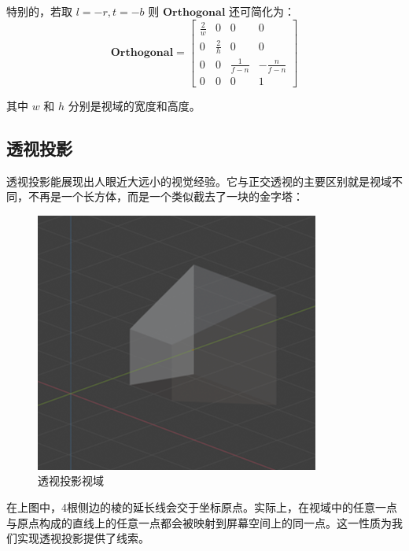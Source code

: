 \documentclass[12pt,oneside,a4paper]{ctexart}
\begin{document}
特别的，若取 $l=-r, t=-b$ 则 $\mathbf{Orthogonal}$ 还可简化为：
\begin{equation}
	\mathbf{Orthogonal}=
	\begin{bmatrix}
		\frac{2}{w} & 0           & 0             & 0              \\
		0           & \frac{2}{h} & 0             & 0              \\
		0           & 0           & \frac{1}{f-n} & -\frac{n}{f-n} \\
		0           & 0           & 0             & 1
	\end{bmatrix}
\end{equation}

其中 $w$ 和 $h$ 分别是视域的宽度和高度。
\subsection{透视投影}
透视投影能展现出人眼近大远小的视觉经验。它与正交透视的主要区别就是视域不同，不再是一个长方体，而是一个类似截去了一块的金字塔：
\begin{figure}[H]
	\centering
	\includegraphics[scale=0.6]{Picture/PerspViewCube.png}
	\vspace{-2ex}
	\caption{透视投影视域}
	\label{PerspViewCube}
\end{figure}

在上图中，4根侧边的棱的延长线会交于坐标原点。实际上，在视域中的任意一点与原点构成的直线上的任意一点都会被映射到屏幕空间上的同一点。这一性质为我们实现透视投影提供了线索。
\end{document}
